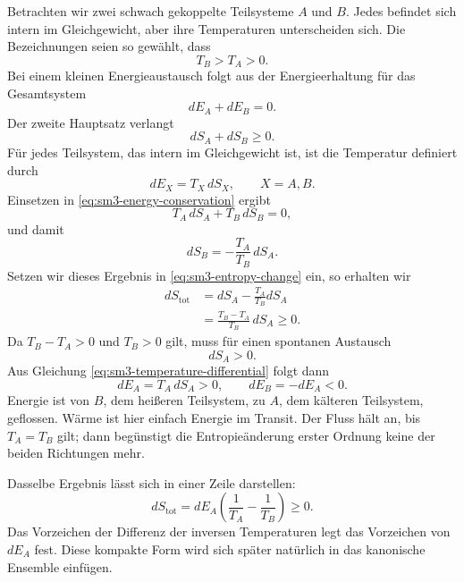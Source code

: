 Betrachten wir zwei schwach gekoppelte Teilsysteme \(A\) und \(B\). Jedes befindet sich intern im Gleichgewicht, aber ihre Temperaturen unterscheiden sich. Die Bezeichnungen seien so gewählt, dass
\begin{equation}
 T_B>T_A>0.
 \label{eq:sm3-temperature-order}
\end{equation}
Bei einem kleinen Energieaustausch folgt aus der Energieerhaltung für das Gesamtsystem
\begin{equation}
 dE_A+dE_B=0.
 \label{eq:sm3-energy-conservation}
\end{equation}
Der zweite Hauptsatz verlangt
\begin{equation}
 dS_A+dS_B\geq0.
 \label{eq:sm3-entropy-change}
\end{equation}
Für jedes Teilsystem, das intern im Gleichgewicht ist, ist die Temperatur definiert durch
\begin{equation}
 dE_X=T_X\,dS_X,
 \qquad X=A,B.
 \label{eq:sm3-temperature-differential}
\end{equation}
Einsetzen in \eqref{eq:sm3-energy-conservation} ergibt
\begin{equation}
 T_A\,dS_A+T_B\,dS_B=0,
\end{equation}
und damit
\begin{equation}
 dS_B=-\frac{T_A}{T_B}\,dS_A.
 \label{eq:sm3-dsb}
\end{equation}
Setzen wir dieses Ergebnis in \eqref{eq:sm3-entropy-change} ein, so erhalten wir
\begin{align}
 dS_{\mathrm{tot}}
 &=dS_A-\frac{T_A}{T_B}dS_A\\
 &=\frac{T_B-T_A}{T_B}\,dS_A\geq0.
 \label{eq:sm3-flow-entropy}
\end{align}
Da \(T_B-T_A>0\) und \(T_B>0\) gilt, muss für einen spontanen Austausch
\[
 dS_A>0.
\]
Aus Gleichung \eqref{eq:sm3-temperature-differential} folgt dann
\begin{equation}
 dE_A=T_A\,dS_A>0,
 \qquad
 dE_B=-dE_A<0.
 \label{eq:sm3-hot-to-cold}
\end{equation}
Energie ist von \(B\), dem heißeren Teilsystem, zu \(A\), dem kälteren Teilsystem, geflossen. Wärme ist hier einfach Energie im Transit. Der Fluss hält an, bis \(T_A=T_B\) gilt; dann begünstigt die Entropieänderung erster Ordnung keine der beiden Richtungen mehr.

Dasselbe Ergebnis lässt sich in einer Zeile darstellen:
\begin{equation}
 dS_{\mathrm{tot}}
 =dE_A\left(\frac{1}{T_A}-\frac{1}{T_B}\right)\geq0.
 \label{eq:sm3-compact-flow}
\end{equation}
Das Vorzeichen der Differenz der inversen Temperaturen legt das Vorzeichen von \(dE_A\) fest. Diese kompakte Form wird sich später natürlich in das kanonische Ensemble einfügen.

